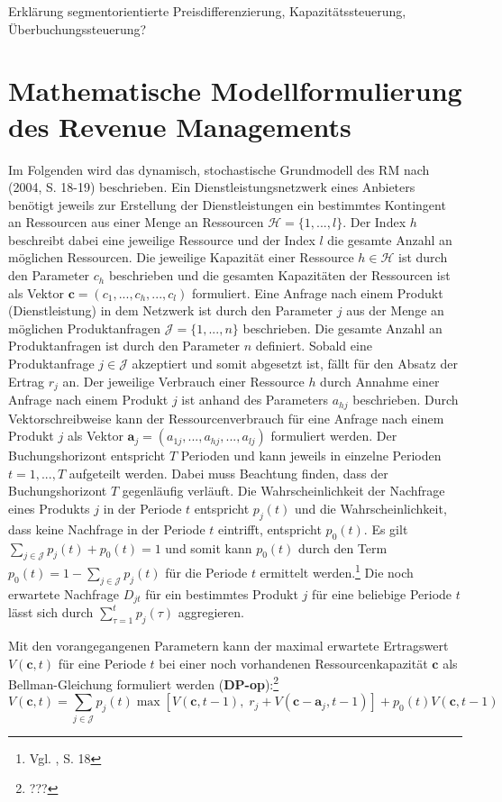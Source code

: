 Erklärung segmentorientierte Preisdifferenzierung, Kapazitätssteuerung, Überbuchungssteuerung?

\section{Mathematische Modellformulierung des Revenue Managements}
Im Folgenden wird das dynamisch, stochastische Grundmodell des RM nach \citeauthor{talluri2004revenue} (2004, S. 18-19) beschrieben. Ein Dienstleistungsnetzwerk eines Anbieters benötigt jeweils zur Erstellung der Dienstleistungen ein bestimmtes Kontingent an Ressourcen aus einer Menge an Ressourcen $\mathcal{H} = \{1,...,l \}$. Der Index $h$ beschreibt dabei eine jeweilige Ressource und der Index $l$ die gesamte Anzahl an möglichen Ressourcen. Die jeweilige Kapazität einer Ressource $h \in \mathcal{H}$ ist durch den Parameter $c_{h}$ beschrieben und die gesamten Kapazitäten der Ressourcen ist als Vektor $\textbf{c}=(c_{1},...,c_{h},...,c_{l})$ formuliert. Eine Anfrage nach einem Produkt (Dienstleistung) in dem Netzwerk ist durch den Parameter $j$ aus der Menge an möglichen Produktanfragen $\mathcal{J} = \{1,...,n \}$ %
beschrieben. Die gesamte Anzahl an Produktanfragen ist durch den Parameter $n$ definiert. Sobald eine Produktanfrage $j\in \mathcal{J}$ akzeptiert und somit abgesetzt ist, fällt für den Absatz der Ertrag $r_{j}$ an. Der jeweilige Verbrauch einer Ressource $h$ durch Annahme einer Anfrage nach einem Produkt $j$ ist anhand des Parameters $a_{hj}$ beschrieben. Durch Vektorschreibweise kann der Ressourcenverbrauch für eine Anfrage nach einem Produkt $j$ als Vektor $\textbf{a}_{j}=(a_{1j},...,a_{hj},...,a_{lj})$ formuliert werden. Der Buchungshorizont entspricht $T$ Perioden und kann jeweils in einzelne Perioden $t=1,...,T$ aufgeteilt werden. Dabei muss Beachtung finden, dass der Buchungshorizont $T$ gegenläufig verläuft. Die Wahrscheinlichkeit der Nachfrage eines Produkts $j$ in der Periode $t$ entspricht $p_{j}(t)$ und die Wahrscheinlichkeit, dass keine Nachfrage in der Periode $t$ eintrifft, entspricht $p_{0}(t)$. Es gilt $\sum_{j\in \mathcal{J}}p_{j}(t)+p_{0}(t)=1$ und somit kann $p_{0}(t)$ durch den Term $p_{0}(t)=1-\sum_{j\in \mathcal{J}}p_{j}(t)$ für die Periode $t$ ermittelt werden.\footnote{Vgl. \citeauthor{talluri2004revenue}, S. 18} Die noch erwartete Nachfrage $D_{jt}$ für ein bestimmtes Produkt $j$ für eine beliebige Periode $t$ lässt sich durch $\sum_{\tau=1}^{t}p_{j}(\tau)$ aggregieren. 


Mit den vorangegangenen Parametern kann der maximal erwartete Ertragswert $V(\textbf{c},t)$ für eine Periode $t$ bei einer noch vorhandenen Ressourcenkapazität $\textbf{c}$ als Bellman-Gleichung formuliert werden (\textbf{DP-op}):\footnote{???}
\begin{equation}\label{DP}
V(\textbf{c},t)=\sum_{j\in\mathcal{J}}p_{j}(t)\max[ V(\textbf{c},t-1),\; r_{j}+V(\textbf{c}-\textbf{a}_{j},t-1)]+p_{0}(t)V(\textbf{c},t-1)
\end{equation}


